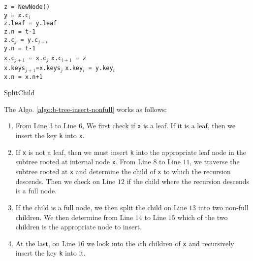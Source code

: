 \begin{algorithm}[H]
\SetAlgoLined
{}
\texttt{z = NewNode()} \\
\texttt{y = x.c$_i$}  \\
\texttt{z.leaf = y.leaf} \\
\texttt{z.n = t-1}\\
 {
	 {
		\texttt{z.c$_j$ = y.c$_{j+t}$} \\
	}
}
\texttt{y.n = t-1}\\
 {
	\texttt{x.c$_{j+1}$ = x.c$_j$}
}
\texttt{x.c$_{i+1}$ = z} \\
 {
	\texttt{x.keys$_{j+1}$=x.keys$_j$}
}
\texttt{x.key$_i$ = y.key$_t$}\\
\texttt{x.n = x.n+1}
\caption{SplitChild}
\label{algo:b-tree-split-child}	
\end{algorithm}

The Algo. \ref{algo:b-tree-insert-nonfull} works as follows:

\begin{enumerate}
	\item From Line $3$ to Line $6$, We first check if \texttt{x} is a leaf. If it is a leaf, then we insert the key \texttt{k} into \texttt{x}.
	\item If \texttt{x} is not a leaf, then we must insert \texttt{k} into the appropriate leaf node in the subtree rooted at internal node \texttt{x}. From Line $8$ to Line $11$, we traverse the subtree rooted at \texttt{x} and determine the child of \texttt{x} to which the recursion descends. Then we check on Line $12$ if the child where the recursion descends is a full node.
	\item If the child is a full node, we then split the child on Line $13$ into two non-full children. We then determine from Line $14$ to Line $15$ which of the two children is the appropriate node to insert.
	\item At the last, on Line $16$ we look into the $i$th children of \texttt{x} and recursively insert the key \texttt{k} into it.
\end{enumerate}

